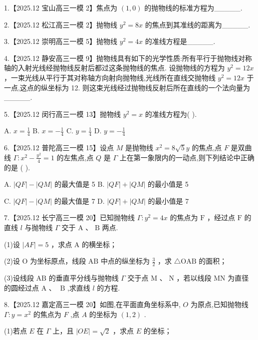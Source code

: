\documentclass[10pt]{article}
\begin{document}
1.【2025.12 宝山高三一模 2】焦点为 \(\left( {1,0}\right)\) 的抛物线的标准方程为\_\_\_\_\_.

2.【2025.12 松江高三一模 2】抛物线 \({y}^{2} = {8x}\) 的焦点到其准线的距离为\_\_\_\_\_.

3.【2025.12 崇明高三一模 5】抛物线 \({y}^{2} = {4x}\) 的准线方程是\_\_\_\_\_.

4.【2025.12 静安高三一模 9】抛物线具有如下的光学性质:所有平行于抛物线对称轴的入射光线经抛物线反射后都过这条抛物线的焦点. 设抛物线的方程为 \({y}^{2} = {12x}\) ，一束光线从平行于其对称轴方向射向抛物线,光线所在直线交抛物线 \({y}^{2} = {12x}\) 于一点,这点的纵坐标为 12. 则这束光线经过抛物线反射后所在直线的一个法向量为\_\_\_\_\_.

5.【2025.12 闵行高三一模 13】抛物线 \({y}^{2} = x\) 的准线方程为( ).

A. \(x = \frac{1}{4}\) B. \(x =  - \frac{1}{4}\) C. \(y = \frac{1}{4}\) D. \(y =  - \frac{1}{4}\)

6.【2025.12 普陀高三一模 15】设点 \(M\) 是抛物线 \({x}^{2} = 8\sqrt{5}y\) 的焦点,点 \(F\) 是双曲线 \(\Gamma  : {x}^{2} - \frac{{y}^{2}}{4} = 1\) 的左焦点,点 \(Q\) 是 \(\Gamma\) 上在第一象限内的一动点,则下列结论中正确的是 ( ).

A. \(\left| {QF}\right|  - \left| {QM}\right|\) 的最大值是 5 B. \(\left| {QF}\right|  + \left| {QM}\right|\) 的最小值是 5

C. \(\left| {QF}\right|  - \left| {QM}\right|\) 的最大值是 7 D. \(\left| {QF}\right|  + \left| {QM}\right|\) 的最小值是 7

7.【2025.12 长宁高三一模 20】已知抛物线 \(\Gamma  : {y}^{2} = {4x}\) 的焦点为 \(\mathrm{F}\) ，经过点 \(\mathrm{F}\) 的直线 \(l\) 与抛物线 \(\Gamma\) 交于 \(\mathrm{A}\text{ 、 }\mathrm{B}\) 两点.

(1)设 \(\left| {AF}\right|  = 5\) ，求点 \(\mathrm{A}\) 的横坐标；

(2)设 \(\mathrm{O}\) 为坐标原点，线段 \(\mathrm{{AB}}\) 中点的纵坐标为 \(\frac{3}{2}\) ，求 \(\bigtriangleup  \mathrm{{OAB}}\) 的面积；

(3)设线段 \(\mathrm{{AB}}\) 的垂直平分线与抛物线 \(\Gamma\) 交于点 \(\mathrm{M}\) 、 \(\mathrm{N}\) ，若以线段 \(\mathrm{{MN}}\) 为直径的圆经过点 \(\mathrm{A}\text{ 、 }\mathrm{\;B}\) ,求直线 \(l\) 的方程.

8.【2025.12 嘉定高三一模 20】如图,在平面直角坐标系中, \(O\) 为原点,已知抛物线 \(\Gamma  : y = {x}^{2}\) 的焦点为 \(F\) ,点 \(A\) 的坐标为 \(\left( {1,2}\right)\) .

(1)若点 \(E\) 在 \(\Gamma\) 上，且 \(\left| {OE}\right|  = \sqrt{2}\) ，求点 \(E\) 的坐标；
\end{document}
